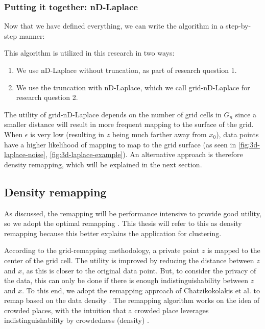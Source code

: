 \subsubsection{Putting it together: nD-Laplace}
Now that we have defined everything, we can write the algorithm in a step-by-step manner:

This algorithm is utilized in this research in two ways:
\begin{enumerate}
    \item We use nD-Laplace without truncation, as part of research question 1.
    \item We use the truncation with nD-Laplace, which we call grid-nD-Laplace for research question 2.
\end{enumerate}

The utility of grid-nD-Laplace depends on the number of grid cells in $G_n$ since a smaller distance will result in more frequent mapping to the surface of the grid.
When $\epsilon$ is very low (resulting in $z$ being much farther away from $x_0$), data points have a higher likelihood of mapping to map to the grid surface 
(as seen in \ref{fig:3d-laplace-noise}, \ref{fig:3d-laplace-example}). 
An alternative approach is therefore density remapping, which will be explained in the next section.
\newpage
\subsection{Density remapping} \label{theory:optimal-remapping}
As discussed, the remapping will be performance intensive to provide good utility, so we adopt the optimal remapping \citep{chatzikokolakis_efficient_2017}.
This thesis will refer to this as density remapping because this better explains the application for clustering.

According to the grid-remapping methodology, a private point $z$ is mapped to the center of the grid cell.
The utility is improved by reducing the distance between $z$ and $x$, as this is closer to the original data point.
But, to consider the privacy of the data, this can only be done if there is enough indistinguishability between $z$ and $x$.
To this end, we adopt the remapping approach of Chatzikokolakis et al. to remap based on the data density \citep{chatzikokolakis_efficient_2017}.
The remapping algorithm works on the idea of crowded places, with the intuition that a crowded place leverages indistinguishability by crowdedness (density) \citep{chatzikokolakis_efficient_2017}.  \newline

